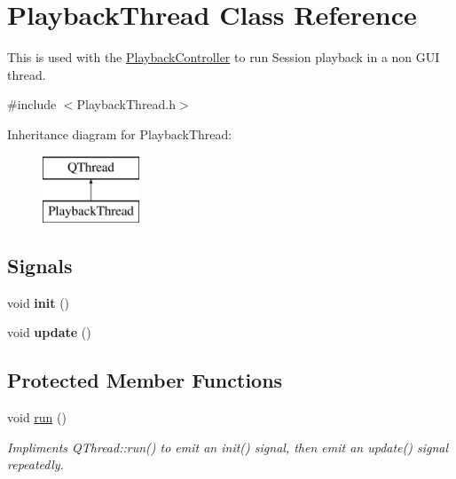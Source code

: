 \hypertarget{class_playback_thread}{\section{Playback\-Thread Class Reference}
\label{class_playback_thread}
}


This is used with the \hyperlink{class_playback_controller}{Playback\-Controller} to run Session playback in a non G\-U\-I thread.  




{\ttfamily \#include $<$Playback\-Thread.\-h$>$}

Inheritance diagram for Playback\-Thread\-:\begin{figure}[H]
\begin{center}
\leavevmode
\includegraphics[height=2.000000cm]{class_playback_thread}
\end{center}
\end{figure}
\subsection*{Signals}
\begin{DoxyCompactItemize}
\item 
\hypertarget{class_playback_thread_a0a37e3cc93bf0cafec28588d16f4b9c9}{void {\bfseries init} ()}\label{class_playback_thread_a0a37e3cc93bf0cafec28588d16f4b9c9}

\item 
\hypertarget{class_playback_thread_adb1cdd2c8e7f0dfaafefa062bd735fc9}{void {\bfseries update} ()}\label{class_playback_thread_adb1cdd2c8e7f0dfaafefa062bd735fc9}

\end{DoxyCompactItemize}
\subsection*{Protected Member Functions}
\begin{DoxyCompactItemize}
\item 
void \hyperlink{class_playback_thread_a5dbdc1173cb9c01c0782a53f21126340}{run} ()
\begin{DoxyCompactList}\small\item\em Impliments Q\-Thread\-::run() to emit an init() signal, then emit an update() signal repeatedly. \end{DoxyCompactList}\end{DoxyCompactItemize}


